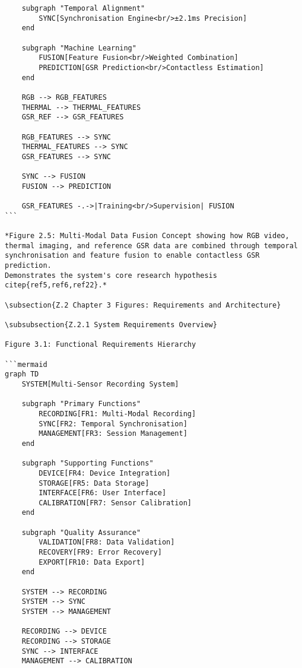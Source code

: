\begin{verbatim}
    subgraph "Temporal Alignment"
        SYNC[Synchronisation Engine<br/>±2.1ms Precision]
    end

    subgraph "Machine Learning"
        FUSION[Feature Fusion<br/>Weighted Combination]
        PREDICTION[GSR Prediction<br/>Contactless Estimation]
    end

    RGB --> RGB_FEATURES
    THERMAL --> THERMAL_FEATURES
    GSR_REF --> GSR_FEATURES

    RGB_FEATURES --> SYNC
    THERMAL_FEATURES --> SYNC
    GSR_FEATURES --> SYNC

    SYNC --> FUSION
    FUSION --> PREDICTION

    GSR_FEATURES -.->|Training<br/>Supervision| FUSION
```

*Figure 2.5: Multi-Modal Data Fusion Concept showing how RGB video,
thermal imaging, and reference GSR data are combined through temporal
synchronisation and feature fusion to enable contactless GSR prediction.
Demonstrates the system's core research hypothesis citep{ref5,ref6,ref22}.*

\subsection{Z.2 Chapter 3 Figures: Requirements and Architecture}

\subsubsection{Z.2.1 System Requirements Overview}

Figure 3.1: Functional Requirements Hierarchy

```mermaid
graph TD
    SYSTEM[Multi-Sensor Recording System]

    subgraph "Primary Functions"
        RECORDING[FR1: Multi-Modal Recording]
        SYNC[FR2: Temporal Synchronisation]
        MANAGEMENT[FR3: Session Management]
    end

    subgraph "Supporting Functions"
        DEVICE[FR4: Device Integration]
        STORAGE[FR5: Data Storage]
        INTERFACE[FR6: User Interface]
        CALIBRATION[FR7: Sensor Calibration]
    end

    subgraph "Quality Assurance"
        VALIDATION[FR8: Data Validation]
        RECOVERY[FR9: Error Recovery]
        EXPORT[FR10: Data Export]
    end

    SYSTEM --> RECORDING
    SYSTEM --> SYNC
    SYSTEM --> MANAGEMENT

    RECORDING --> DEVICE
    RECORDING --> STORAGE
    SYNC --> INTERFACE
    MANAGEMENT --> CALIBRATION


\end{verbatim}
